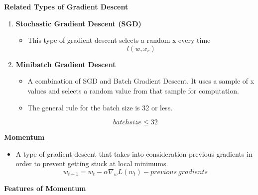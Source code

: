     
    \textbf{Related Types of Gradient Descent}
    \begin{enumerate}
        \item \textbf{Stochastic Gradient Descent (SGD)}
        \begin{itemize}
            \item This type of gradient descent selects a random x every time
            \[
            l(w,x_r)
            \]
        \end{itemize}

        \item \textbf{Minibatch Gradient Descent}
        \begin{itemize}
            \item A combination of SGD and Batch Gradient Descent. It uses a sample of x values and selects a random value from that sample for computation.
            \item The general rule for the batch size is 32 or less.
        \end{itemize} 
        \[
        batchsize \leq 32
        \]
    \end{enumerate}
    \item \textbf{Momentum}
    \begin{itemize}
        \item  A type of gradient descent that takes into consideration previous gradients in order to prevent getting stuck at local minimums.
        \[
        w_{t+1}=w_t-\alpha \nabla_w L(w_t)-previous\ gradients
        \]
    \end{itemize}
    \textbf{Features of Momentum}
